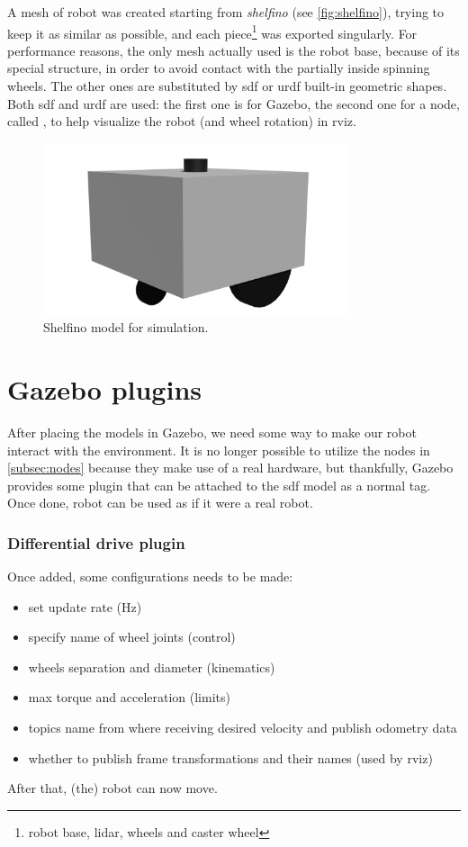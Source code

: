A mesh of robot was created starting from {\it shelfino} (see \autoref{fig:shelfino}), trying to keep it as similar as possible, and each piece\footnote{robot base, lidar, wheels and caster wheel} was exported singularly. For performance reasons, the only mesh actually used is the robot base, because of its special structure, in order to avoid contact with the partially inside spinning wheels. The other ones are substituted by \Acrshort{sdf} or \Acrfull{urdf} built-in geometric shapes.
Both \Acrshort{sdf} and \Acrshort{urdf} are used: the first one is for Gazebo, the second one for a node, called , to help visualize the robot (and wheel rotation) in \Acrshort{rviz}.

\begin{figure}[h]
    \centering
    \includegraphics[width=0.8\textwidth]{images/shelfino_3d.png}
    \caption{Shelfino model for simulation.}
\end{figure}

\section{Gazebo plugins}

After placing the models in Gazebo, we need some way to make our robot interact with the environment. It is no longer possible to utilize the nodes in \autoref{subsec:nodes} because they make use of a real hardware, but thankfully, Gazebo provides some plugin that can be attached to the \Acrshort{sdf} model as a normal tag. Once done, robot can be used as if it were a real robot.


\subsubsection{Differential drive plugin}

Once added, some configurations needs to be made:
\begin{itemize}
    \item set update rate (Hz)
    \item specify name of wheel joints (control)
    \item wheels separation and diameter (kinematics)
    \item max torque and acceleration (limits)
    \item topics name from where receiving desired velocity and publish odometry data
    \item whether to publish frame transformations and their names (used by \Acrshort{rviz})
\end{itemize}
After that, (the) robot can now move.

